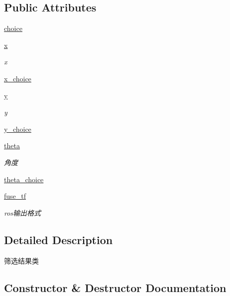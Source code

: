 \subsection*{Public Attributes}
\begin{DoxyCompactItemize}
\item 
\hyperlink{classfuse___g___a__dox_1_1_s_e_l_e_c_t_e_d_a790b58ac8f8f0b0f1076f8231203afe5}{choice}
\item 
\hyperlink{classfuse___g___a__dox_1_1_s_e_l_e_c_t_e_d_a9711f3c3729c12cacd17eb7821ec98a0}{x}
\begin{DoxyCompactList}\small\item\em x \end{DoxyCompactList}\item 
\hyperlink{classfuse___g___a__dox_1_1_s_e_l_e_c_t_e_d_a7fbd25f3e389e17a7f64bfdcc94f364d}{x\+\_\+choice}
\item 
\hyperlink{classfuse___g___a__dox_1_1_s_e_l_e_c_t_e_d_a97b55edbf6512d9c686bee70666f5566}{y}
\begin{DoxyCompactList}\small\item\em y \end{DoxyCompactList}\item 
\hyperlink{classfuse___g___a__dox_1_1_s_e_l_e_c_t_e_d_ac33a7943dceb57ce48109d93c15f616e}{y\+\_\+choice}
\item 
\hyperlink{classfuse___g___a__dox_1_1_s_e_l_e_c_t_e_d_a374cb0ab136265b1a493fa6f482b1349}{theta}
\begin{DoxyCompactList}\small\item\em 角度 \end{DoxyCompactList}\item 
\hyperlink{classfuse___g___a__dox_1_1_s_e_l_e_c_t_e_d_a5de20d510d30129fb05fd8021a13f64b}{theta\+\_\+choice}
\item 
\hyperlink{classfuse___g___a__dox_1_1_s_e_l_e_c_t_e_d_a20e5f00e641d941a96325712319952c7}{fuse\+\_\+tf}
\begin{DoxyCompactList}\small\item\em ros输出格式 \end{DoxyCompactList}\end{DoxyCompactItemize}


\subsection{Detailed Description}
筛选结果类 



\subsection{Constructor \& Destructor Documentation}
\mbox{\label{classfuse___g___a__dox_1_1_s_e_l_e_c_t_e_d_aa6bcac8e79b063b09e554afc8ff393ab}} 
